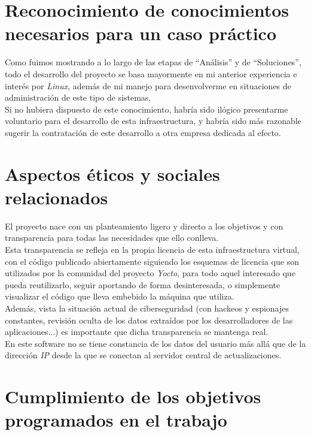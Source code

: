 \section{Reconocimiento de conocimientos necesarios para un caso práctico}

Como fuimos mostrando a lo largo de las etapas de ``Análisis'' y de ``Soluciones'', todo el desarrollo del proyecto se basa mayormente en mi anterior experiencia e interés por \textit{Linux}, además de mi manejo para desenvolverme en situaciones de administración de este tipo de sistemas.\\

Si no hubiera dispuesto de este conocimiento, habría sido ilógico presentarme voluntario para el desarrollo de esta infraestructura, y habría sido más razonable sugerir la contratación de este desarrollo a otra empresa dedicada al efecto.

\section{Aspectos éticos y sociales relacionados}

El proyecto nace con un planteamiento ligero y directo a los objetivos y con transparencia para todas las necesidades que ello conlleva.\\

Esta transparencia se refleja en la propia licencia de esta infraestructura virtual, con el código publicado abiertamente siguiendo los esquemas de licencia que son utilizados por la comunidad del proyecto \textit{Yocto}, para todo aquel interesado que pueda reutilizarlo,  seguir aportando de forma desinteresada, o simplemente visualizar el código que lleva embebido la máquina que utiliza.\\

Además, vista la situación actual de ciberseguridad (con hackeos y espionajes constantes, revisión oculta de los datos extraídos por los desarrolladores de las aplicaciones...) es importante que dicha transparencia se mantenga real.\\

En este software no se tiene constancia de los datos del usuario más allá que de la dirección \textit{IP} desde la que se conectan al servidor central de actualizaciones.\\

\section{Cumplimiento de los objetivos programados en el trabajo}


